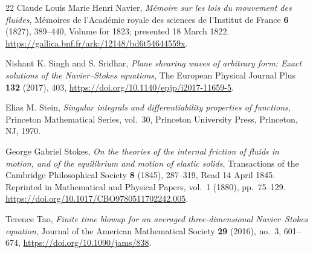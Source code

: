 \begin{thebibliography}{22}
%
Claude Louis Marie Henri Navier,
\emph{Mémoire sur les lois du mouvement des fluides},
Mémoires de l'Académie royale des sciences de l'Institut de France
\textbf{6} (1827), 389--440, Volume for 1823; presented 18 March 1822.
\url{https://gallica.bnf.fr/ark:/12148/bd6t54644559x}.

Nishant K. Singh and S. Sridhar,
\emph{Plane shearing waves of arbitrary form: Exact solutions of the Navier--Stokes equations},
The European Physical Journal Plus \textbf{132} (2017), 403,
\url{https://doi.org/10.1140/epjp/i2017-11659-5}.

Elias M. Stein, \emph{Singular integrals and differentiability properties of functions},
Princeton Mathematical Series, vol.~30, Princeton University Press,
Princeton, NJ, 1970.

George Gabriel Stokes,
\emph{On the theories of the internal friction of fluids in motion, and of the equilibrium and motion of elastic solids},
Transactions of the Cambridge Philosophical Society \textbf{8} (1845),
287--319, Read 14 April 1845. Reprinted in Mathematical and Physical Papers,
vol.~1 (1880), pp.~75--129.
\url{https://doi.org/10.1017/CBO9780511702242.005}.

Terence Tao,
\emph{Finite time blowup for an averaged three-dimensional Navier--Stokes equation},
Journal of the American Mathematical Society \textbf{29} (2016), no.~3,
601--674, \url{https://doi.org/10.1090/jams/838}.

\end{thebibliography}
